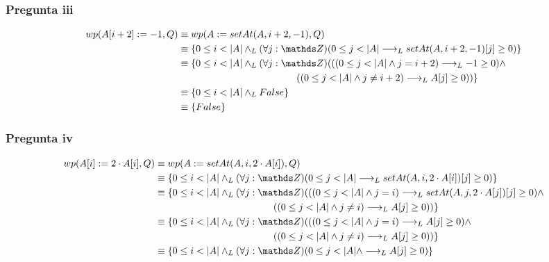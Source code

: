 \subsubsection*{Pregunta iii}
\begin{align*}
    wp(A[i+2] := -1,Q) &\equiv wp(A := setAt(A, i+2, -1),Q) \\
    &\equiv \{ 0 \leq i < |A| \yLuego (\forall j: \ent)(0 \leq j < |A| \implicaLuego setAt(A, i+2, -1)[j] \geq 0) \} \\
    &\equiv \{ 0 \leq i < |A| \yLuego (\forall j: \ent)(((0 \leq j < |A| \wedge j = i+2) \implicaLuego -1 \geq 0) \wedge \\
    &\qquad \qquad \qquad \qquad \qquad \qquad \: ((0 \leq j < |A| \wedge j \neq i+2) \implicaLuego A[j] \geq 0))\} \\
    &\equiv \{ 0 \leq i < |A| \yLuego False \} \\
    &\equiv \{ False \} \\
\end{align*}

\subsubsection*{Pregunta iv}
\begin{align*}
    wp(A[i] := 2 \cdot A[i],Q) &\equiv wp(A:= setAt(A, i, 2\cdot A[i]),Q) \\
    &\equiv \{ 0 \leq i < |A| \yLuego (\forall j: \ent)(0 \leq j < |A| \implicaLuego setAt(A, i, 2\cdot A[i])[j] \geq 0) \} \\
    &\equiv \{ 0 \leq i < |A| \yLuego (\forall j: \ent)(((0 \leq j < |A| \wedge j = i) \implicaLuego setAt(A, j, 2\cdot A[j])[j] \geq 0) \wedge \\
    &\qquad \qquad \qquad \qquad \qquad \qquad \: ((0 \leq j < |A| \wedge j \neq i) \implicaLuego A[j] \geq 0)) \} \\
    &\equiv \{ 0 \leq i < |A| \yLuego (\forall j: \ent)(((0 \leq j < |A| \wedge j = i) \implicaLuego A[j] \geq 0) \wedge \\
    &\qquad \qquad \qquad \qquad \qquad \qquad \: ((0 \leq j < |A| \wedge j \neq i) \implicaLuego A[j] \geq 0)) \} \\
    &\equiv \{ 0 \leq i < |A| \yLuego (\forall j: \ent)(0 \leq j < |A| \wedge \implicaLuego A[j] \geq 0) \}
\end{align*}

